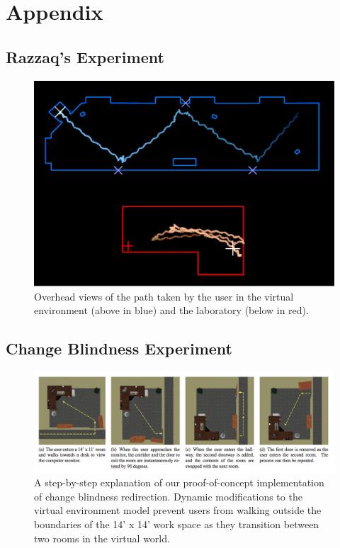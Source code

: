 \documentclass[12pt]{article}
\begin{document}
\clearpage





\appendix
\section*{Appendix}
\subsection*{Razzaq's Experiment}
\begin{figure}[!ht]
\includegraphics[width = 0.5 \textwidth]{Razzaq}
\caption[Razzaq's Experiment]{Overhead views of the path taken by the user in the virtual environment (above in blue) and the laboratory (below in red).}
\end{figure}
\subsection*{Change Blindness Experiment}
\begin{figure}[!ht]
\includegraphics[width = 0.8 \textwidth]{Change_Blindness}
\caption[Change Blindness Experiment]{A step-by-step explanation of our proof-of-concept implementation of change blindness redirection. Dynamic modifications to the virtual environment model prevent users from walking outside the boundaries of the 14’ x 14’ work space as they transition between two rooms in the virtual world.}
\end{figure}



\clearpage
\nocite{*}


\clearpage


\end{document}
